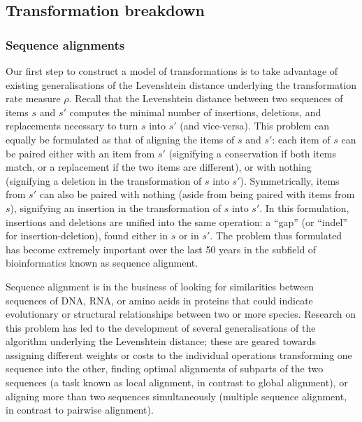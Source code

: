 \subsection{Transformation breakdown}\label{transformation-breakdown}

\subsubsection{Sequence alignments}\label{sequence-alignments}

Our first step to construct a model of transformations is to take
advantage of existing generalisations of the Levenshtein distance
underlying the transformation rate measure \(\rho\). Recall that the
Levenshtein distance between two sequences of items \(s\) and \(s'\)
computes the minimal number of insertions, deletions, and replacements
necessary to turn \(s\) into \(s'\) (and vice-versa). This problem can
equally be formulated as that of aligning the items of \(s\) and \(s'\):
each item of \(s\) can be paired either with an item from \(s'\)
(signifying a conservation if both items match, or a replacement if the
two items are different), or with nothing (signifying a deletion in the
transformation of \(s\) into \(s'\)). Symmetrically, items from \(s'\)
can also be paired with nothing (aside from being paired with items from
\(s\)), signifying an insertion in the transformation of \(s\) into
\(s'\). In this formulation, insertions and deletions are unified into
the same operation: a \enquote{gap} (or \enquote{indel} for
insertion-deletion), found either in \(s\) or in \(s'\). The problem
thus formulated has become extremely important over the last 50 years in
the subfield of bioinformatics known as sequence alignment.

Sequence alignment is in the business of looking for similarities
between sequences of DNA, RNA, or amino acids in proteins that could
indicate evolutionary or structural relationships between two or more
species. Research on this problem has led to the development of several
generalisations of the algorithm underlying the Levenshtein distance;
these are geared towards assigning different weights or costs to the
individual operations transforming one sequence into the other, finding
optimal alignments of subparts of the two sequences (a task known as
local alignment, in contrast to global alignment), or aligning more than
two sequences simultaneously (multiple sequence alignment, in contrast
to pairwise alignment).

